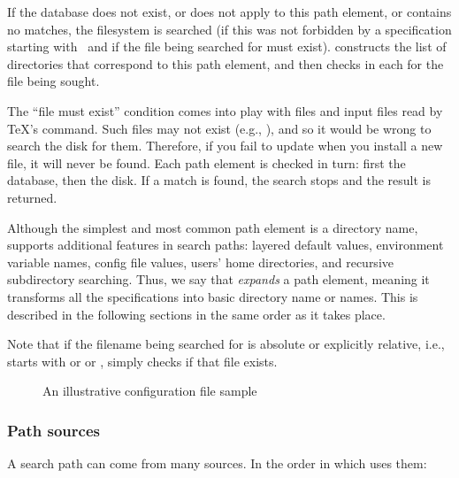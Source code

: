 \documentclass{article}
\begin{document}
If the database does not exist, or does not apply to this path
element, or contains no matches, the filesystem is searched (if this
was not forbidden by a specification starting with \samp{!!}\ and if
the file being searched for must exist).  \KPS{} constructs the list
of directories that correspond to this path element, and then checks
in each for the file being sought.

The ``file must exist'' condition comes into play with  files and
input files read by \TeX's  command.  Such files may not
exist (e.g., ), and so it would be wrong to search the
disk for them.  Therefore, if you fail to update  when you
install a new  file, it will never be found.
Each path element is checked in turn: first the database, then the
disk.  If a match is found, the search stops and the result is
returned.

Although the simplest and most common path element is a directory
name, \KPS{} supports additional features in search paths: layered
default values, environment variable names, config file values, users'
home directories, and recursive subdirectory searching.  Thus, we say
that \KPS{} \emph{expands} a path element, meaning it transforms all
the specifications into basic directory name or names.  This is
described in the following sections in the same order as it takes
place.

Note that if the filename being searched for is absolute or explicitly
relative, i.e., starts with \samp{/} or  or ,
\KPS{} simply checks if that file exists.

\ifSingleColumn
\else
\begin{figure*}

\setlength{\abovecaptionskip}{0pt}
  \caption{An illustrative configuration file sample}
  \label{fig:config-sample}
\end{figure*}
\fi

\subsubsection{Path sources}
\label{Path-sources}

A search path can come from many sources.  In the order in which
\KPS{} uses them:
\end{document}
